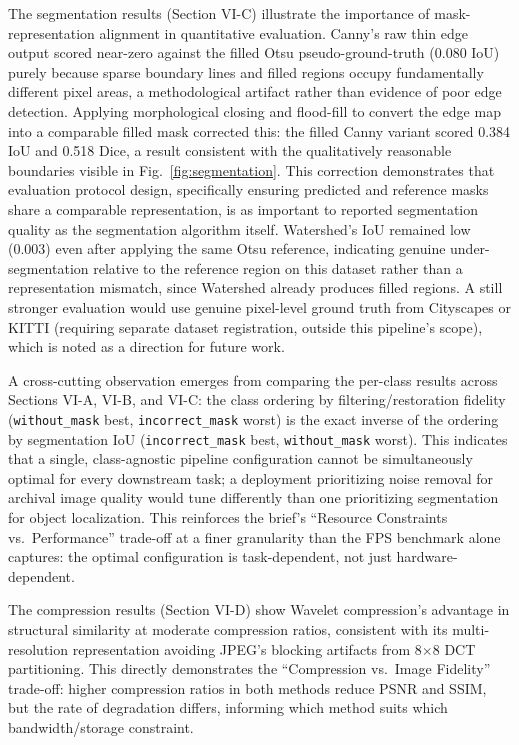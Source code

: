 \documentclass[conference]{IEEEtran}
\begin{document}
The segmentation results (Section VI-C) illustrate the importance of mask-representation alignment in quantitative evaluation. Canny's raw thin edge output scored near-zero against the filled Otsu pseudo-ground-truth (0.080 IoU) purely because sparse boundary lines and filled regions occupy fundamentally different pixel areas, a methodological artifact rather than evidence of poor edge detection. Applying morphological closing and flood-fill to convert the edge map into a comparable filled mask corrected this: the filled Canny variant scored 0.384 IoU and 0.518 Dice, a result consistent with the qualitatively reasonable boundaries visible in Fig.~\ref{fig:segmentation}. This correction demonstrates that evaluation protocol design, specifically ensuring predicted and reference masks share a comparable representation, is as important to reported segmentation quality as the segmentation algorithm itself. Watershed's IoU remained low (0.003) even after applying the same Otsu reference, indicating genuine under-segmentation relative to the reference region on this dataset rather than a representation mismatch, since Watershed already produces filled regions. A still stronger evaluation would use genuine pixel-level ground truth from Cityscapes or KITTI (requiring separate dataset registration, outside this pipeline's scope), which is noted as a direction for future work.

A cross-cutting observation emerges from comparing the per-class results across Sections VI-A, VI-B, and VI-C: the class ordering by filtering/restoration fidelity (\texttt{without\_mask} best, \texttt{incorrect\_mask} worst) is the exact inverse of the ordering by segmentation IoU (\texttt{incorrect\_mask} best, \texttt{without\_mask} worst). This indicates that a single, class-agnostic pipeline configuration cannot be simultaneously optimal for every downstream task; a deployment prioritizing noise removal for archival image quality would tune differently than one prioritizing segmentation for object localization. This reinforces the brief's ``Resource Constraints vs.\ Performance'' trade-off at a finer granularity than the FPS benchmark alone captures: the optimal configuration is task-dependent, not just hardware-dependent.

The compression results (Section VI-D) show Wavelet compression's advantage in structural similarity at moderate compression ratios, consistent with its multi-resolution representation avoiding JPEG's blocking artifacts from 8$\times$8 DCT partitioning. This directly demonstrates the ``Compression vs.\ Image Fidelity'' trade-off: higher compression ratios in both methods reduce PSNR and SSIM, but the rate of degradation differs, informing which method suits which bandwidth/storage constraint.
\end{document}

